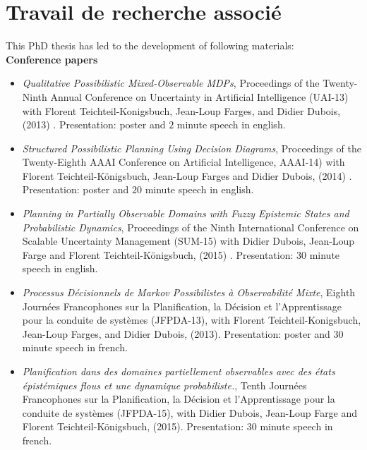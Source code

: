 \chapter*{Travail de recherche associ\'e}

This PhD thesis has led to the development of following materials:\\

\textbf{Conference papers}
\begin{itemize}
\item \textit{Qualitative {P}ossibilistic {M}ixed-{O}bservable {MDP}s}, 
Proceedings of the Twenty-Ninth Annual Conference on Uncertainty in Artificial Intelligence (UAI-13) 
with Florent Teichteil-Konigsbuch, Jean-Loup Farges, and Didier Dubois, (2013) \cite{Drougard13}. Presentation: poster and $2$ minute speech in english.
\item \textit{Structured Possibilistic Planning Using Decision Diagrams}, 
Proceedings of the Twenty-Eighth {AAAI} Conference on Artificial Intelligence,
AAAI-14) with Florent Teichteil{-}K{\"{o}}nigsbuch, Jean-Loup Farges and Didier Dubois,
(2014) \cite{DBLP:conf/aaai/DrougardTFD14}. Presentation: poster and $20$ minute speech in english.
\item \textit{Planning in Partially Observable Domains with Fuzzy Epistemic States and Probabilistic Dynamics},
Proceedings of the Ninth International Conference on Scalable Uncertainty Management (SUM-15)
with Didier Dubois, Jean-Loup Farge and Florent Teichteil-K\"onigsbuch, (2015) \cite{DBLP:conf/sum/DrougardDFT15}. Presentation: $30$ minute speech in english.
\item \textit{Processus D\'ecisionnels de Markov Possibilistes \`a Observabilit\'e Mixte},
Eighth Journ\'ees Francophones sur la Planification, la D\'ecision et l'Apprentissage pour la conduite de syst\`emes (JFPDA-13),
with Florent Teichteil-Konigsbuch, Jean-Loup Farges, and Didier Dubois, (2013). Presentation: poster and $30$ minute speech in french.
\item \textit{Planification dans des domaines partiellement
observables avec des \'etats \'epist\'emiques flous
et une dynamique probabiliste.},
Tenth Journ\'ees Francophones sur la Planification, la D\'ecision et l'Apprentissage pour la conduite de syst\`emes (JFPDA-15),
with Didier Dubois, Jean-Loup Farge and Florent Teichteil-K\"onigsbuch, (2015). Presentation: $30$ minute speech in french.
\end{itemize}

